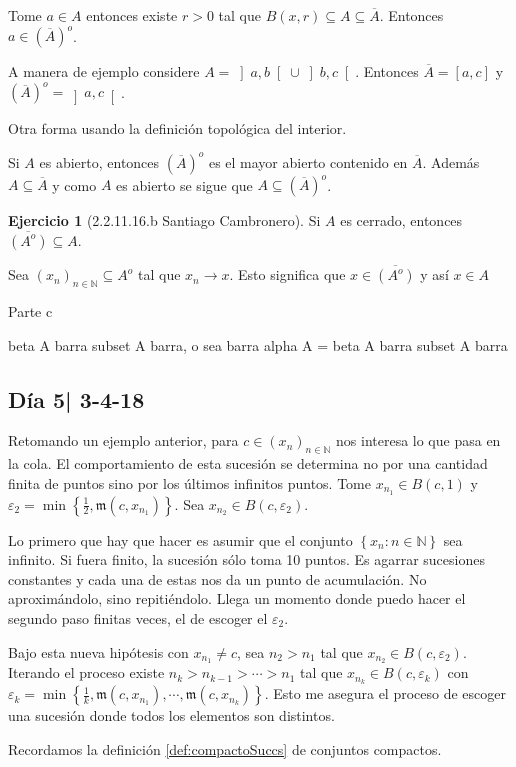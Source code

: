 \documentclass[12pt]{article}
\theoremstyle{plain}
\theoremstyle{definition}
\newtheorem{Ej}[Th]{Ejercicio}
\theoremstyle{remark}
\numberwithin{equation}{section}
\newcommand{\bN}{\mathbb{N}}        %
\newcommand{\mm}{\mathfrak{m}}      %
\renewcommand{\:}{\colon}           %
\newcommand{\conj}[1]{\left\lbrace#1\right\rbrace}
\newcommand{\bonj}[1]{\left\lbrack#1\right\rbrack}
\newcommand{\obonj}[1]{\left\rbrack#1\right\lbrack}
\begin{document}
\begin{multicols}{2}
\begin{ptcb}
Tome $a\in A$ entonces existe $r>0$ tal que $B(x,r)\subseteq A\subseteq\overline{A}$. Entonces $a\in (\overline{A})^o$. \par
A manera de ejemplo considere $A=\obonj{a,b}\cup\obonj{b,c}$. Entonces $\overline{A}=\bonj{a,c}$ y $(\overline{A})^o=\obonj{a,c}$.
\end{ptcb}

Otra forma usando la definición topológica del interior.
\begin{ptcb}
Si $A$ es abierto, entonces $(\overline{A})^o$ es el mayor abierto contenido en $\overline{A}$. Además $A\subseteq\overline{A}$ y como $A$ es abierto se sigue que $A\subseteq(\overline{A})^o$.
\end{ptcb}


\begin{Ej}[2.2.11.16.b Santiago Cambronero]
 Si $A$ es cerrado, entonces $\overline{(A^o)}\subseteq A$.
\end{Ej}

\begin{ptcb}
Sea $(x_n)_{n\in\bN}\subseteq A^o$ tal que $x_n\to x$. Esto significa que $x\in \overline{(A^o)}$ y así $x\in A$
\end{ptcb}

Parte c
\begin{ptcb}
beta A barra subset A barra, o sea barra alpha A = beta A barra subset A barra
\end{ptcb}

\subsection{Día 5| 3-4-18}

Retomando un ejemplo anterior, para $c\in(x_n)_{n\in\bN}$ nos interesa lo que pasa en la cola. El comportamiento de esta sucesión se determina no por una cantidad finita de puntos sino por los últimos infinitos puntos. Tome $x_{n_1}\in B(c,1)$ y $\varepsilon_2=\min\conj{\frac{1}{2},\mm(c,x_{n_1})}$. Sea $x_{n_2}\in B(c,\varepsilon_2)$. \par
Lo primero que hay que hacer es asumir que el conjunto $\conj{x_n\colon n\in\bN}$ sea infinito. Si fuera finito, la sucesión sólo toma 10 puntos. Es agarrar sucesiones constantes y cada una de estas nos da un punto de acumulación. No aproximándolo, sino repitiéndolo. Llega un momento donde puedo hacer el segundo paso finitas veces, el de escoger el $\varepsilon_2$.\par
Bajo esta nueva hipótesis con $x_{n_1}\neq c$, sea $n_2>n_1$ tal que $x_{n_2}\in B(c,\varepsilon_2)$. Iterando el proceso existe $n_k>n_{k-1}>\cdots>n_1$ tal que $x_{n_k}\in B(c,\varepsilon_k)$ con $\varepsilon_k=\min\conj{\frac{1}{k},\mm(c,x_{n_1}),\cdots,\mm(c,x_{n_k})}$. Esto me asegura el proceso de escoger una sucesión donde todos los elementos son distintos.\par
Recordamos la definición \ref{def:compactoSuccs} de conjuntos compactos.\par


\end{multicols}
\end{document}
